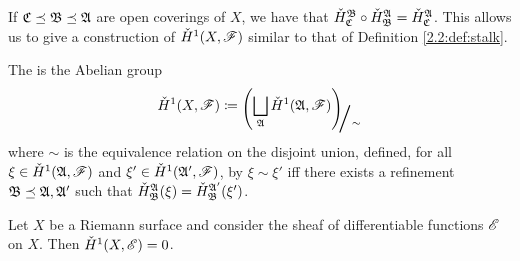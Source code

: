 \documentclass[../Moduli_Spaces_of_Riemann_Surfaces.tex]{subfiles}
\begin{document}
    \begin{remark}
        If $\mathfrak{C}\preceq\mathfrak{B}\preceq\mathfrak{A}$ are open coverings of $X$, we have that $\check{H}^{\mathfrak{B}}_{\mathfrak{C}}\circ\check{H}^{\mathfrak{A}}_{\mathfrak{B}}=\check{H}^{\mathfrak{A}}_{\mathfrak{C}}$. This allows us to give a construction of $\check{H}^1\!\left(X,\mathscr{F}\right)$ similar to that of Definition \ref{2.2:def:stalk}.\exqed
    \end{remark}
    \begin{definition}
        The  is the Abelian group
        \begin{equation*}
            \check{H}^1\!\l(X,\ms{F}\r)\coloneqq\raisebox{-2pt}{$\Biggl(\!$}\bigsqcup_{\mf{A}}\check{H}^1\!\l(\mf{A},\ms{F}\r)\!\raisebox{-2pt}{$\Biggr)$}\!\!_{\scalebox{2}{/}\sim}
        \end{equation*}
        where $\sim$ is the equivalence relation on the disjoint union, defined, for all $\xi\in\check{H}^1\!\left(\mathfrak{A},\mathscr{F}\right)$ and $\xi'\in\check{H}^1\!\left(\mathfrak{A}',\mathscr{F}\right)$, by $\xi\sim\xi'$ iff there exists a refinement $\mathfrak{B}\preceq\mathfrak{A},\mathfrak{A}'$ such that $\check{H}^{\mathfrak{A}}_{\mathfrak{B}}\!\left(\xi\right)=\check{H}^{\mathfrak{A}'}_{\mathfrak{B}}\!\left(\xi'\right)$.
    \end{definition}
    \vspace{-0.05in}
    \begin{proposition}
        Let $X$ be a Riemann surface and consider the sheaf of differentiable functions $\mathscr{E}$ on $X$. Then $\check{H}^1\!\left(X,\mathscr{E}\right)=0$.
    \end{proposition}
\end{document}
